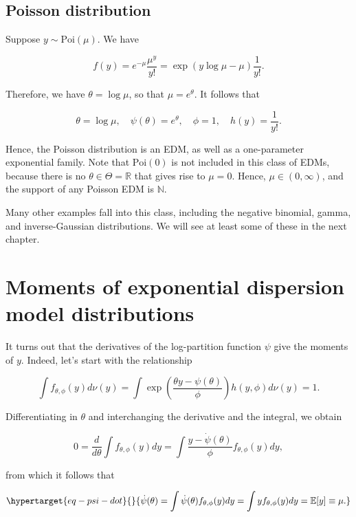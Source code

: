 \documentclass[
  11pt,
  letterpaper,
  oneside]{book}
\theoremstyle{definition}
\theoremstyle{plain}
\theoremstyle{plain}
\theoremstyle{plain}
\theoremstyle{remark}
\begin{document}
\hypertarget{poisson-distribution}{%
\subsection{Poisson distribution}\label{poisson-distribution}}

Suppose \(y \sim \text{Poi}(\mu)\). We have

\[
f(y) = e^{-\mu}\frac{\mu^y}{y!} = \exp(y \log \mu - \mu)\frac{1}{y!}.
\]

Therefore, we have \(\theta = \log \mu\), so that \(\mu = e^\theta\). It
follows that

\[
\theta = \log \mu, \quad \psi(\theta) = e^\theta,\quad \phi = 1, \quad h(y) = \frac{1}{y!}.
\]

Hence, the Poisson distribution is an EDM, as well as a one-parameter
exponential family. Note that \(\text{Poi}(0)\) is not included in this
class of EDMs, because there is no \(\theta \in \Theta = \mathbb{R}\)
that gives rise to \(\mu = 0\). Hence, \(\mu \in (0,\infty)\), and the
support of any Poisson EDM is \(\mathbb{N}\).

Many other examples fall into this class, including the negative
binomial, gamma, and inverse-Gaussian distributions. We will see at
least some of these in the next chapter.

\hypertarget{moments-of-exponential-dispersion-model-distributions}{%
\section{Moments of exponential dispersion model
distributions}\label{moments-of-exponential-dispersion-model-distributions}}

It turns out that the derivatives of the log-partition function \(\psi\)
give the moments of \(y\). Indeed, let's start with the relationship

\[
\int f_{\theta, \phi}(y)d\nu(y) = \int \exp\left(\frac{\theta y - \psi(\theta)}{\phi}\right)h(y, \phi) d\nu(y) = 1.
\]

Differentiating in \(\theta\) and interchanging the derivative and the
integral, we obtain

\[
0 = \frac{d}{d\theta} \int f_{\theta, \phi}(y)dy = \int \frac{y - \dot \psi(\theta)}{\phi}f_{\theta, \phi}(y) dy,
\]

from which it follows that

\begin{equation}\protect\hypertarget{eq-psi-dot}{}{
\dot \psi(\theta) = \int \dot \psi(\theta)f_{\theta, \phi}(y)dy = \int y f_{\theta, \phi}(y)dy = \mathbb{E}[y] \equiv \mu.
}\label{eq-psi-dot}\end{equation}
\end{document}

